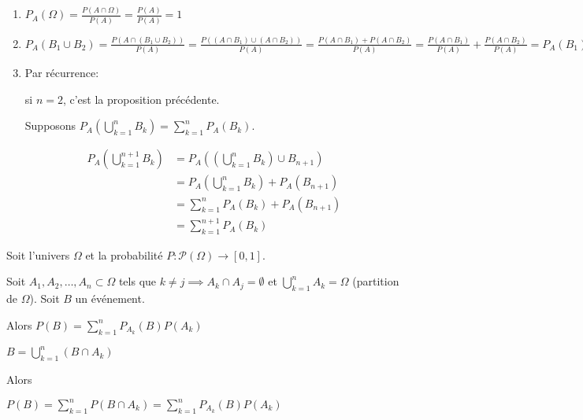 \documentclass[a4paper, 12pt]{article}
\begin{document}
\begin{demonstration}
    \begin{enumerate}
        \item $P_A(\Omega) = \frac{P(A \cap \Omega)}{P(A)} = \frac{P(A)}{P(A)} = 1$
        \item $P_A(B_1 \cup B_2) = \frac{P(A \cap (B_1 \cup B_2))}{P(A)} = \frac{P((A \cap B_1) \cup (A \cap B_2))}{P(A)} = \frac{P(A \cap B_1) + P(A \cap B_2)}{P(A)} = \frac{P(A \cap B_1)}{P(A)} + \frac{P(A \cap B_2)}{P(A)} = P_A(B_1) + P_A(B_2)$
        \item Par récurrence:
        
            si $n=2$, c'est la proposition précédente.

            Supposons $P_A\left(\bigcup\limits_{k=1}^{n} B_k\right) = \sum_{k=1}^{n} P_A(B_k)$.

            \begin{align*}
                P_A\left(\bigcup_{k=1}^{n+1} B_k\right) &= P_A\left(\left(\bigcup_{k=1}^{n} B_k\right) \cup B_{n+1}\right) \\
                &= P_A\left(\bigcup_{k=1}^{n} B_k\right) + P_A(B_{n+1}) \\
                &= \sum_{k=1}^{n} P_A(B_k) + P_A(B_{n+1}) \\
                &= \sum_{k=1}^{n+1} P_A(B_k)
            \end{align*}
    \end{enumerate}
\end{demonstration}

\begin{theorem}
    Soit l'univers $\Omega$ et la probabilité $P: \mathcal{P}(\Omega) \to [0, 1]$.

    Soit $A_1, A_2, \ldots, A_n \subset \Omega$ tels que $k \neq j \implies A_k \cap A_j = \emptyset$ et $\bigcup\limits_{k=1}^n A_k = \Omega$ (partition de $\Omega$).
    Soit $B$ un événement.

    Alors $P(B) = \sum\limits_{k=1}^n P_{A_k}(B)P(A_k)$
\end{theorem}

\begin{demonstration}
    $B = \bigcup\limits_{k=1}^n (B \cap A_k)$

    Alors

    $P(B) = \sum\limits_{k=1}^n P(B \cap A_k) = \sum\limits_{k=1}^n P_{A_k}(B)P(A_k)$
\end{demonstration}
\end{document}
